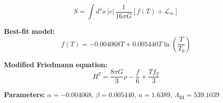 
\begin{equation}
  S = \int d^4x \, |e| \, \frac{1}{16\pi G} \left[ f(T) + \mathcal{L}_m \right]
\end{equation}

\textbf{Best-fit model:}
\begin{equation}
  f(T) = -0.004068 T + 0.005440 T \ln\!\left(\frac{T}{T_0}\right)
\end{equation}

\textbf{Modified Friedmann equation:}
\begin{equation}
  H^2 = \frac{8\pi G}{3} \rho - \frac{f}{6} + \frac{T f_T}{3}
\end{equation}

\textbf{Parameters:}
$\alpha = -0.004068$, \quad
$\beta = 0.005440$, \quad
$n = 1.6389$, \quad
$\Lambda_{\text{BI}} = 539.1039$